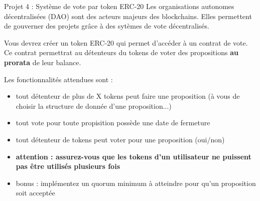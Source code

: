 \begin{frame}{Projet 4 : Système de vote par token ERC-20}
  Les organisations autonomes décentralisées (DAO) sont des acteurs majeurs des blockchains.
  Elles permettent de gouverner des projets grâce à des sytèmes de vote décentralisés.

  Vous devrez créer un token ERC-20 qui permet d'accéder à un contrat de vote.
  Ce contrat permettrat au détenteurs du tokens de voter des propositions \textbf{au prorata} de leur balance.

  Les fonctionnalités attendues sont :

  \begin{itemize}
    \item tout détenteur de plus de X tokens peut faire une proposition (à vous de choisir la structure de donnée d'une proposition...)
    \item tout vote pour toute propisition possède une date de fermeture
    \item tout détenteur de tokens peut voter pour une proposition (oui/non)
    \item \textbf{attention : assurez-vous que les tokens d'un utilisateur ne puissent pas être utilisés plusieurs fois}
    \item bonus : implémentez un quorum minimum à atteindre pour qu'un proposition soit acceptée
  \end{itemize}
\end{frame}